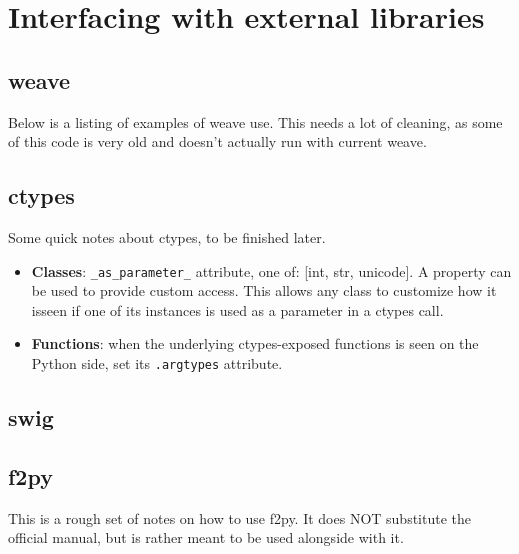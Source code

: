 
\chapter[External libraries]{Interfacing with external libraries}


\section{weave}


Below is a listing of examples of weave use. This needs a lot of cleaning,
as some of this code is very old and doesn't actually run with current
weave. 




\section{ctypes }

Some quick notes about ctypes, to be finished later.


\begin{itemize}

\item \textbf{Classes}: \texttt{\_as\_parameter\_} attribute, one of: {[}int,
  str, unicode]. A property can be used to provide custom access. This allows
  any class to customize how it isseen if one of its instances is used as a
  parameter in a ctypes call.

\item \textbf{Functions}: when the underlying ctypes-exposed functions is
seen on the Python side, set its \texttt{.argtypes} attribute.

\end{itemize}


\section{swig }


\section{f2py }

This is a rough set of notes on how to use f2py. It does NOT substitute
the official manual, but is rather meant to be used alongside with
it. 

